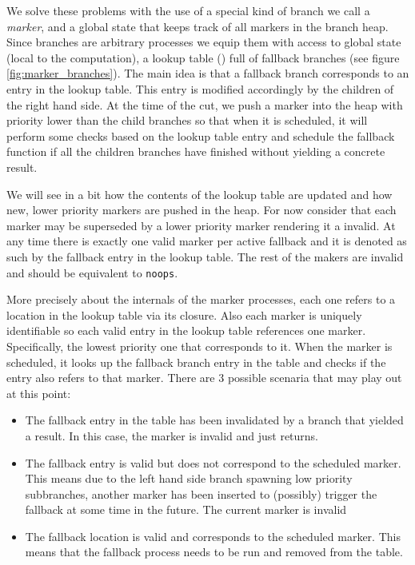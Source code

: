 We solve these problems with the use of a special kind of branch we
call a \emph{marker}, and a global state that keeps track of all markers in the 
branch heap. Since branches are arbitrary
processes we equip them with access to global state (local to the
computation), a lookup table () full of fallback
branches (see figure \ref{fig:marker_branches}).
The main idea is that a fallback branch corresponds to an
entry in the lookup table. This entry is modified accordingly by the
children of the right hand side. At the time of the cut, we push a
marker into the heap with priority lower than the child branches so
that when it is scheduled, it will perform some checks based on the
lookup table entry and schedule the fallback function if all the
children branches have finished without yielding a concrete result.

We will see in a bit how the contents of the lookup table are updated
and how new, lower priority markers are pushed in the heap. For now
consider that each marker may be superseded by a lower priority marker
rendering it a invalid. At any time there is exactly one valid marker
per active fallback and it is denoted as such by the fallback entry in
the lookup table. The rest of the makers are invalid and should be
equivalent to \texttt{noops}.

More precisely about the internals of the marker processes, each one
refers to a location in the lookup table via its closure. Also each
marker is uniquely identifiable so each valid entry in the lookup
table references one marker. Specifically, the lowest priority one that
corresponds to it. When the marker is scheduled, it looks up the
fallback branch entry in the table and checks if the entry also refers
to that marker. There are 3 possible scenaria that may play out at
this point:

\begin{itemize}
\item The fallback entry in the table has been invalidated by a branch
  that yielded a result. In this case, the marker is invalid and just
  returns.
\item The fallback entry is valid but does not correspond to the
  scheduled marker. This means due to the left hand side branch
  spawning low priority subbranches, another marker has been inserted
  to (possibly) trigger the fallback at some time in the future. The
  current marker is invalid
\item The fallback location is valid and corresponds to the scheduled
  marker. This means that the fallback process needs to be run
  and removed from the table.
\end{itemize}

